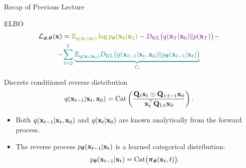 \documentclass{beamer}
\begin{document}
\begin{frame}{Recap of Previous Lecture}
	\begin{block}{ELBO}
		\vspace{-0.7cm}
		\begin{multline*}
            \cL_{\bphi, \btheta}(\bx) =  {\color{olive}\bbE_{q(\bx_1 | \bx_0)} \log \pt(\bx_0 | \bx_1)} - {\color{violet}\KL\bigl(q(\bx_T | \bx_0) \| p(\bx_T)\bigr)} - \\
            - {\color{teal}\sum_{t=2}^T \underbrace{ \bbE_{q(\bx_t | \bx_0)} \KL \bigl(q(\bx_{t-1} | \bx_t, \bx_0) \| \pt(\bx_{t-1} | \bx_t)\bigr)}_{\cL_t}}
        \end{multline*}
		\vspace{-0.7cm}
	\end{block}
	\begin{block}{Discrete conditioned reverse distribution}
		\[
			q(\mathbf{x}_{t-1} | \mathbf{x}_t, \mathbf{x}_0)
			= \operatorname{Cat}\left(\frac{\mathbf{Q}_t \mathbf{x}_t \odot \mathbf{Q}_{1:t-1} \mathbf{x}_0}{\mathbf{x}_t^{\top}\mathbf{Q}_{1:t}\mathbf{x}_0}\right).
		\]
		\vspace{-0.3cm}
	\end{block}
	\begin{itemize}
		\item Both $q(\mathbf{x}_{t-1} | \mathbf{x}_t, \mathbf{x}_0)$ and $q(\mathbf{x}_t | \mathbf{x}_0)$ are known analytically from the forward process.
		\item The reverse process $p_{\boldsymbol{\theta}}(\mathbf{x}_{t-1} | \mathbf{x}_t)$ is a learned categorical distribution:
		\vspace{-0.3cm}
        \[
			p_{\boldsymbol{\theta}}(\mathbf{x}_{t-1} | \mathbf{x}_t) = \operatorname{Cat}\bigl( \boldsymbol{\pi}_{\boldsymbol{\theta}}(\mathbf{x}_t, t) \bigr).
		\]
	\end{itemize}
\end{frame}
\end{document}
